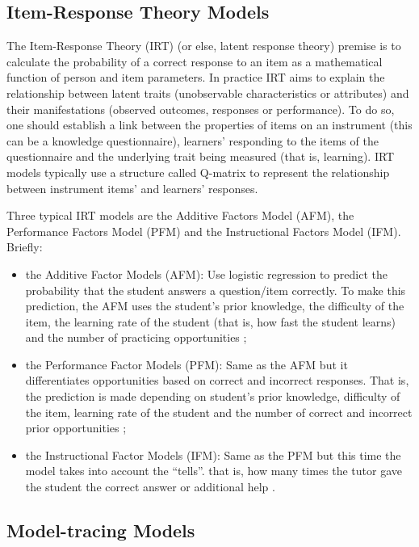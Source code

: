 \documentclass[
]{book}
\providecommand{\tightlist}{%
  \setlength{\itemsep}{0pt}\setlength{\parskip}{0pt}}
\begin{document}
\subsection{Item-Response Theory Models}\label{item-response-theory-models}

The Item-Response Theory (IRT) (or else, latent response theory) premise is to calculate the probability of a correct response to an item as a mathematical function of person and item parameters. In practice IRT aims to explain the relationship between latent traits (unobservable characteristics or attributes) and their manifestations (observed outcomes, responses or performance). To do so, one should establish a link between the properties of items on an instrument (this can be a knowledge questionnaire), learners' responding to the items of the questionnaire and the underlying trait being measured (that is, learning). IRT models typically use a structure called Q-matrix to represent the relationship between instrument items' and learners' responses.

Three typical IRT models are the Additive Factors Model (AFM), the Performance Factors Model (PFM) and the Instructional Factors Model (IFM). Briefly:

\begin{itemize}
\tightlist
\item
  the Additive Factor Models (AFM): Use logistic regression to predict the probability that the student answers a question/item correctly. To make this prediction, the AFM uses the student's prior knowledge, the difficulty of the item, the learning rate of the student (that is, how fast the student learns) and the number of practicing opportunities \citep{cen2006learning};
\item
  the Performance Factor Models (PFM): Same as the AFM but it differentiates opportunities based on correct and incorrect responses. That is, the prediction is made depending on student's prior knowledge, difficulty of the item, learning rate of the student and the number of correct and incorrect prior opportunities \citep{pavlik2009performance};
\item
  the Instructional Factor Models (IFM): Same as the PFM but this time the model takes into account the ``tells''. that is, how many times the tutor gave the student the correct answer or additional help \citep{chi2011instructional}.
\end{itemize}

\subsection{Model-tracing Models}\label{model-tracing-models}
\end{document}

